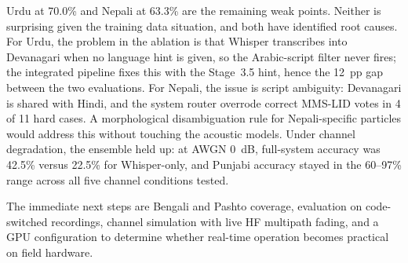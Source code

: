 \documentclass[conference]{IEEEtran}
\begin{document}
Urdu at 70.0\% and Nepali at 63.3\% are the remaining weak points. Neither is surprising given the training data situation, and both have identified root causes. For Urdu, the problem in the ablation is that Whisper transcribes into Devanagari when no language hint is given, so the Arabic-script filter never fires; the integrated pipeline fixes this with the Stage~3.5 hint, hence the 12~pp gap between the two evaluations. For Nepali, the issue is script ambiguity: Devanagari is shared with Hindi, and the system router overrode correct MMS-LID votes in 4 of 11 hard cases. A morphological disambiguation rule for Nepali-specific particles would address this without touching the acoustic models. Under channel degradation, the ensemble held up: at AWGN 0~dB, full-system accuracy was 42.5\% versus 22.5\% for Whisper-only, and Punjabi accuracy stayed in the 60--97\% range across all five channel conditions tested.

The immediate next steps are Bengali and Pashto coverage, evaluation on code-switched recordings, channel simulation with live HF multipath fading, and a GPU configuration to determine whether real-time operation becomes practical on field hardware.
\end{document}
